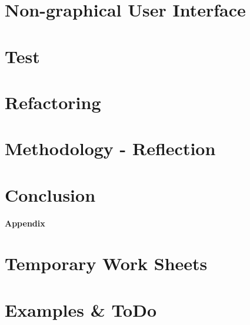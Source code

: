 \chapter{Non-graphical User Interface}
\label{chap:tactileInterface}


\chapter{Test}
\label{chap:test}


\chapter{Refactoring}
\label{chap:refactoring}


\chapter{Methodology - Reflection}
\label{chap:reflectionMethodology}


\chapter{Conclusion}
\label{chap:conclusion}




\appendix	%

\clearforchapter
\begin{vplace}[0.7]
\begin{center}
\Huge \textbf{Appendix}
\end{center}
\end{vplace}



\chapter{Temporary Work Sheets}
\label{chap:temp}









\chapter{Examples \& ToDo}

\clearpage
\listoftodos
